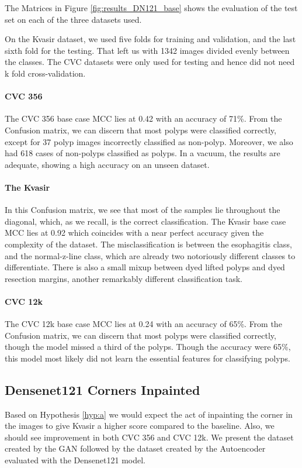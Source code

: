 \noindent
The Matrices in Figure \ref{fig:results_DN121_base} shows the evaluation of the test set on each of the three datasets used. 

On the Kvasir dataset, we used five folds for training and validation, and the last sixth fold for the testing. That left us with 1342 images divided evenly between the classes. The CVC datasets were only used for testing and hence did not need k fold cross-validation.

\paragraph{CVC 356}
The CVC 356 base case MCC lies at 0.42 with an accuracy of 71\%. 
From the Confusion matrix, we can discern that most polyps were classified correctly, except for 37 polyp images incorrectly classified as non-polyp. Moreover, we also had 618 cases of non-polyps classified as polyps.
In a vacuum, the results are adequate, showing a high accuracy on an unseen dataset.

\paragraph{The Kvasir}
In this Confusion matrix, we see that most of the samples lie throughout the diagonal, which, as we recall, is the correct classification. 
The Kvasir base case MCC lies at 0.92 which coincides with a near perfect accuracy given the complexity of the dataset. 
The misclassification is between the esophagitis class, and the normal-z-line class, which are already two notoriously different classes to differentiate.
There is also a small mixup between dyed lifted polyps and dyed resection margins, another remarkably different classification task. 


\paragraph{CVC 12k}
The CVC 12k base case MCC lies at 0.24 with an accuracy of 65\%. 
From the Confusion matrix, we can discern that most polyps were classified correctly, though the model missed a third of the polyps.
Though the accuracy were 65\%, this model most likely did not learn the essential features for classifying polyps.




\subsection{Densenet121 Corners Inpainted}
Based on Hypothesis \ref{hyp:a} we would expect the act of inpainting the corner in the images to give Kvasir a higher score compared to the baseline. Also, we should see improvement in both CVC 356 and CVC 12k.
We present the dataset created by the  GAN followed by the dataset created by the Autoencoder evaluated with the Densenet121 model.

